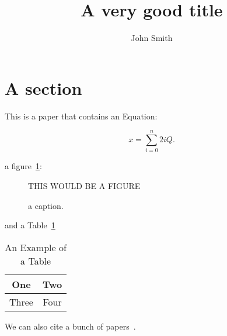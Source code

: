 \documentclass[crop=false]{standalone}
\begin{document}
\title{A very good title}
\author{John Smith}
\date{}
\maketitle

\section{A section}\label{section}
This is a paper that contains an Equation:

\begin{equation}
\label{eq1}
x = \sum_{i=0}^{n} 2{i} Q.
\end{equation}

a figure~\ref{fig_1}:

\begin{figure}[!t]
\centering
THIS WOULD BE A FIGURE
\caption{a caption.}
\label{fig_1}
\end{figure}

and a Table~\ref{table1}
\begin{table}[!t]
\caption{An Example of a Table\label{table1}}
\centering
\begin{tabular}{|c||c|}
\hline
One & Two\\
\hline
Three & Four\\
\hline
\end{tabular}
\end{table}

We can also cite a bunch of papers~\cite{LopBlu2010cor,BeuFonLopPaqVah09:tec,BluBleLop09-BeamSearch-LCS,LopPraPae08aco,LopPaqStu05:jmma}.



\end{document}
